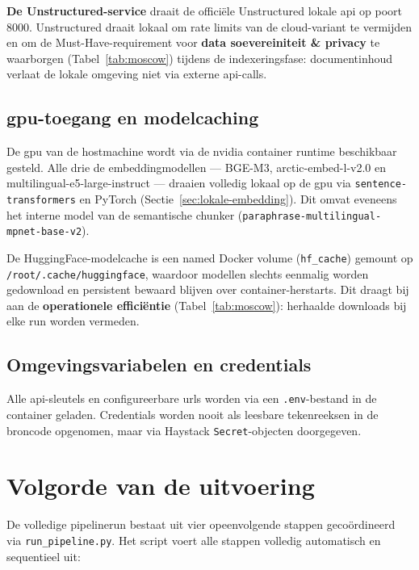 \textbf{De Unstructured-service} draait de officiële Unstructured lokale \gls{api} op poort 8000. Unstructured draait lokaal om rate limits van de cloud-variant te vermijden en om de Must-Have-requirement voor \textbf{data soevereiniteit \& privacy} te waarborgen (Tabel~\ref{tab:moscow}) tijdens de indexeringsfase: documentinhoud verlaat de lokale omgeving niet via externe \gls{api}-calls.

\subsection{\gls{gpu}-toegang en modelcaching}

De \gls{gpu} van de hostmachine wordt via de \gls{nvidia} container runtime beschikbaar gesteld. Alle drie de embeddingmodellen — BGE-M3, arctic-embed-l-v2.0 en multilingual-e5-large-instruct — draaien volledig lokaal op de \gls{gpu} via \texttt{sentence-transformers} en PyTorch (Sectie~\ref{sec:lokale-embedding}). Dit omvat eveneens het interne model van de semantische chunker (\texttt{paraphrase-multilingual-mpnet-base-v2}).

De HuggingFace-modelcache is een named Docker volume (\texttt{hf\_cache}) gemount op \texttt{/root/.cache/huggingface}, waardoor modellen slechts eenmalig worden gedownload en persistent bewaard blijven over container-herstarts. Dit draagt bij aan de \textbf{operationele efficiëntie} (Tabel~\ref{tab:moscow}): herhaalde downloads bij elke run worden vermeden.

\subsection{Omgevingsvariabelen en credentials}

Alle \gls{api}-sleutels en configureerbare \glspl{url} worden via een \texttt{.env}-bestand in de container geladen. Credentials worden nooit als leesbare tekenreeksen in de broncode opgenomen, maar via Haystack \texttt{Secret}-objecten doorgegeven.

\section{Volgorde van de uitvoering}
\label{sec:uitvoering-volgorde}

De volledige pipelinerun bestaat uit vier opeenvolgende stappen gecoördineerd via \texttt{run\_pipeline.py}. Het script voert alle stappen volledig automatisch en sequentieel uit:

